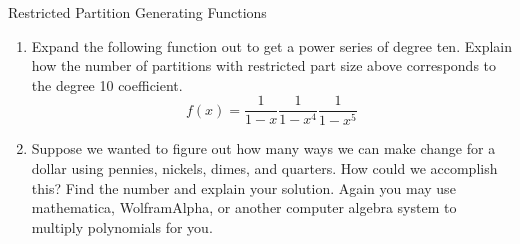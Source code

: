 \begin{exercise}{Restricted Partition Generating Functions \Coffeecup \Coffeecup \Coffeecup}

\begin{enumerate}

\item Expand the following function out to get a power series of degree ten. Explain how the number of partitions with restricted part size above corresponds to the degree 10 coefficient. $$f(x)=\frac{1}{1-x}\frac{1}{1-x^4}\frac{1}{1-x^5}$$

\vspace*{3in}

\item Suppose we wanted to figure out how many ways we can make change for a dollar using pennies, nickels, dimes, and quarters.  How could we accomplish this?  Find the number and explain your solution.  Again you may use mathematica, WolframAlpha, or another computer algebra system to multiply polynomials for you.

\vspace*{2in}

\end{enumerate}
\end{exercise}